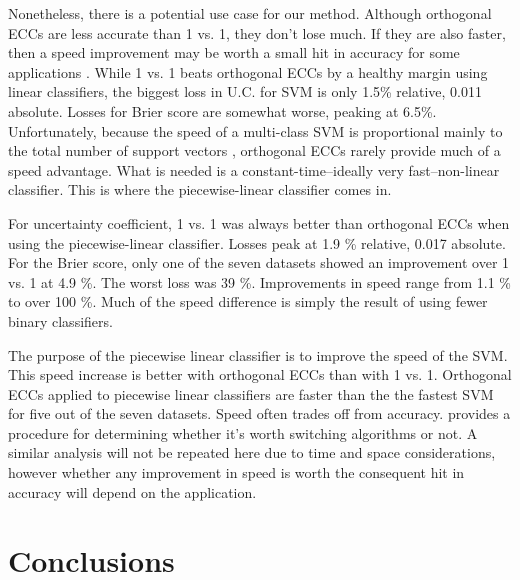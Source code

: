 {Nonetheless, there is a potential use case for our method.
Although orthogonal ECCs are less accurate than 1 vs. 1, they
don't lose much.
If they are also faster, then a speed improvement may be worth a small
hit in accuracy for some applications \citep{Mills2018}.
While 1 vs. 1 beats orthogonal ECCs by a healthy margin using linear
classifiers, the biggest loss in U.C. for SVM is only 1.5\% relative, 
0.011 absolute.
Losses for Brier score are somewhat worse,
peaking at 6.5\%.
Unfortunately, because the speed of a multi-class SVM is proportional
mainly to the total number of support vectors \citep{Mills2018},
orthogonal ECCs rarely provide much of a speed advantage.
What is needed is a constant-time--ideally very fast--non-linear classifier.
This is where the piecewise-linear classifier comes in.

For uncertainty coefficient, 1 vs. 1 was always better than orthogonal ECCs
when using the piecewise-linear classifier. 
Losses peak at 1.9 \% relative, 0.017 absolute.
For the Brier score, only one of the seven datasets showed an improvement
over 1 vs. 1 at 4.9 \%.
The worst loss was 39 \%.
Improvements in speed range from 1.1 \% to over 100 \%.
Much of the speed difference is simply the result of using fewer binary
classifiers.

The purpose of the piecewise linear classifier is to improve the speed of the
SVM.
This speed increase is better with orthogonal ECCs than with 1 vs. 1.
Orthogonal ECCs applied to piecewise linear classifiers 
are faster than the the fastest
SVM for five out of the seven datasets.
Speed often trades off from accuracy.
\citet{Mills2018} provides a procedure for determining whether it's worth
switching algorithms or not.
A similar analysis will not be repeated here due to time and space 
considerations, however whether any improvement in speed is worth
the consequent hit in accuracy will depend on the application.}

\section{Conclusions}

